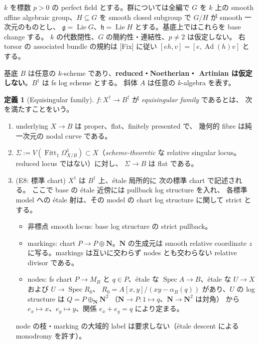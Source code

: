 \documentclass[11pt,a4paper]{article}
\numberwithin{equation}{section}
\theoremstyle{definition}
\newtheorem{definition}{定義}[section]
\DeclareMathOperator{\Ad}{Ad}
\DeclareMathOperator{\Lie}{Lie}
\DeclareMathOperator{\Fitt}{Fitt}
\newcommand{\g}{\mathfrak g}
\newcommand{\h}{\mathfrak h}
\begin{document}
\(k\) を標数 \(p>0\) の perfect field とする。群については全編で
\(G\) を \(k\) 上の smooth affine algebraic group、\(H\subseteq G\) を
smooth closed subgroup で \(G/H\) が smooth 一次元のものとし、
\(\g=\Lie G\)、\(\h=\Lie H\) とする。基底上ではこれらを base change する。
\(k\) の代数閉性、\(G\) の簡約性・連結性、\(p\neq2\) は仮定しない。
右 torsor の associated bundle の規約は [Fix] に従い
\([eh,v]=[e,\Ad(h)v]\) とする。

基底 \(B\) は任意の \(k\)-scheme であり、\textbf{reduced・Noetherian・
Artinian は仮定しない}。\(B^\dagger\) は fs log scheme とする。
斜体 \(A\) は任意の \(k\)-algebra を表す。

\begin{definition}[Equisingular family]\label{def:EQ}
\(f:X^\dagger\to B^\dagger\) が \emph{equisingular family} であるとは、
次を満たすことをいう。
\begin{enumerate}[label=(EQ\arabic*)]
\item underlying \(X\to B\) は proper、flat、finitely presented で、
  幾何的 fibre は純一次元の nodal curve である。
\item \(\Sigma:=V(\Fitt_1\Omega^1_{X/B})\subset X\)（\emph{scheme-theoretic}
  な relative singular locus。reduced locus ではない）に対し、
  \(\Sigma\to B\) は flat である。
\item (E8: 標準 chart) \(X^\dagger\) は \(B^\dagger\) 上、étale 局所的に
  次の標準 chart で記述される。
  ここで base の étale 近傍には pullback log structure を入れ、
  各標準 model への étale 射は、その model の chart log structure
  に関して strict とする。
  \begin{itemize}
  \item 非標点 smooth locus: base log structure の strict pullback。
  \item markings: chart \(P\to P\oplus\mathbf N\)。\(\mathbf N\) の生成元は
    smooth relative coordinate \(z\) に写る。markings は互いに交わらず
    nodes とも交わらない relative divisor である。
  \item nodes: fs chart \(P\to M_B\) と \(q\in P\)、étale な
    \(\operatorname{Spec}A\to B\)、étale な
    \(U\to X\) および \(U\to\operatorname{Spec}R_0\)、
    \(R_0=A[x,y]/(xy-\alpha_B(q))\) があり、\(U\) の log structure は
    \(Q=P\oplus_{\mathbf N}\mathbf N^2\)
    （\(\mathbf N\to P:1\mapsto q\)、\(\mathbf N\to\mathbf N^2\) は対角）
    から $e_x\mapsto x$、$e_y\mapsto y$、関係 \(e_x+e_y=q\) により定まる。
  \end{itemize}
  node の枝・marking の大域的 label は要求しない（étale descent による
  monodromy を許す）。
\end{enumerate}
\end{definition}
\end{document}
